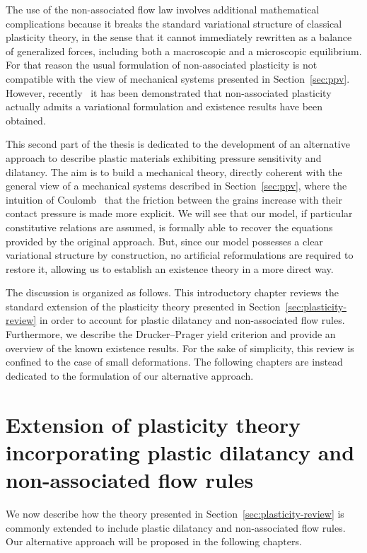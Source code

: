 \documentclass[a4paper,10pt,oneside]{amsbook}
\numberwithin{section}{chapter}
\numberwithin{equation}{chapter}
\theoremstyle{definition}
\begin{document}
The use of the non-associated flow law involves additional mathematical complications because it breaks the standard variational structure of classical plasticity theory, in the sense that it cannot immediately rewritten as a balance of generalized forces, including both a macroscopic and a microscopic equilibrium. For that reason the usual formulation of non-associated plasticity is not compatible with the view of mechanical systems presented in Section~\ref{sec:ppv}. However, recently~\cite{morafrancfort,StefanelliVikelis2024} it has been demonstrated that non-associated plasticity actually admits a variational formulation and existence results have been obtained.

This second part of the thesis is dedicated to the development of an alternative approach to describe plastic materials exhibiting pressure sensitivity and dilatancy. The aim is to build a mechanical theory, directly coherent with the general view of a mechanical systems described in Section~\ref{sec:ppv}, where the intuition of Coulomb~\cite{Coulomb1776} that the friction between the grains increase with their contact pressure is made more explicit. We will see that our model, if particular constitutive relations are assumed, is formally able to recover the equations provided by the original approach. But, since our model possesses a clear variational structure by construction, no artificial reformulations are required to restore it, allowing us to establish an existence theory in a more direct way.

The discussion is organized as follows. This introductory chapter reviews the standard extension of the plasticity theory presented in Section~\ref{sec:plasticity-review} in order to account for plastic dilatancy and non-associated flow rules. Furthermore, we describe the Drucker--Prager yield criterion and provide an overview of the known existence results. For the sake of simplicity, this review is confined to the case of small deformations. The following chapters are instead dedicated to the formulation of our alternative approach.

\section{Extension of plasticity theory incorporating plastic dilatancy and non-associated flow rules}
\label{sec:plasticity-review-soil}

We now describe how the theory presented in Section~\ref{sec:plasticity-review} is commonly extended to include plastic dilatancy and non-associated flow rules. Our alternative approach will be proposed in the following chapters.
\end{document}
